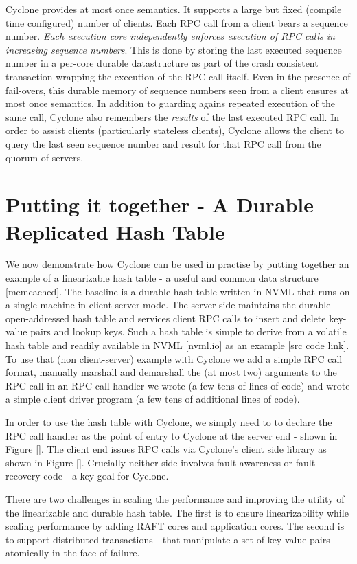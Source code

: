 \documentclass[twocolumn]{article}
\begin{document}
Cyclone provides at most once semantics. It supports a large but fixed (compile
time configured) number of clients. Each RPC call from a client bears a sequence
number. \emph{Each execution core independently enforces execution of RPC calls
  in increasing sequence numbers}. This is done by storing the last executed
sequence number in a per-core durable datastructure as part of the crash
consistent transaction wrapping the execution of the RPC call itself. Even in
the presence of fail-overs, this durable memory of sequence numbers seen from a
client ensures at most once semantics. In addition to guarding agains repeated
execution of the same call, Cyclone also remembers the \emph{results} of the
last executed RPC call. In order to assist clients (particularly stateless
clients), Cyclone allows the client to query the last seen sequence number and
result for that RPC call from the quorum of servers.


\section{Putting it together - A Durable Replicated Hash Table}
\label{sec:example}
We now demonstrate how Cyclone can be used in practise by putting together an
example of a linearizable hash table - a useful and common data structure
[memcached]. The baseline is a durable hash table written in NVML that runs on a
single machine in client-server mode. The server side maintains the durable
open-addressed hash table and services client RPC calls to insert and delete
key-value pairs and lookup keys. Such a hash table is simple to derive from a
volatile hash table and readily available in NVML [nvml.io] as an example [src
  code link]. To use that (non client-server) example with Cyclone we add a
simple RPC call format, manually marshall and demarshall the (at most two)
arguments to the RPC call in an RPC call handler we wrote (a few tens of lines
of code) and wrote a simple client driver program (a few tens of additional
lines of code).

In order to use the hash table with Cyclone, we simply need to to declare the RPC
call handler as the point of entry to Cyclone at the server end - shown in
Figure []. The client end issues RPC calls via Cyclone's client side library as
shown in Figure []. Crucially neither side involves fault awareness or fault
recovery code - a key goal for Cyclone.

There are two challenges in scaling the performance and improving the utility of
the linearizable and durable hash table. The first is to ensure linearizability
while scaling performance by adding RAFT cores and application cores. The second
is to support distributed transactions - that manipulate a set of key-value
pairs atomically in the face of failure.
\end{document}
